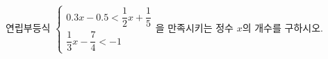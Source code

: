 연립부등식 $\begin{cases} 0.3x-0.5<\dfrac{1}{2}x+\dfrac{1}{5} \\[4pt] \dfrac{1}{3}x-\dfrac{7}{4}<-1 \end{cases}$을 만족시키는 정수 $x$의 개수를 구하시오.
